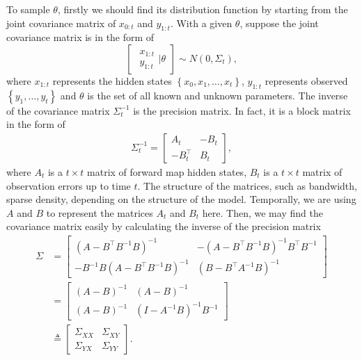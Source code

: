 To sample $\theta$, firstly we should find its distribution function by starting from the joint covariance matrix of $x_{0:t}$ and $y_{1:t}$. With a given $\theta$, suppose the joint covariance matrix is in the form of 
\begin{equation}\label{generaljointmatrix}
\begin{bmatrix} \begin{matrix} x_{1:t}\\ y_{1:t}  \end{matrix} \biggr\rvert \theta \end{bmatrix}
\sim N\left(0, \Sigma_t \right),
\end{equation}
where $x_{1:t}$ represents the hidden states $\left\lbrace x_0,x_1,\dots,x_t\right\rbrace$, $y_{1:t}$ represents observed $\left\lbrace y_1,\dots,y_t\right\rbrace$ and $\theta$ is the set of all known and unknown parameters. The inverse of the covariance matrix $\Sigma_t^{-1}$ is the precision matrix. In fact, it is a block matrix in the form of 
\begin{align*} \Sigma_t^{-1}=
\begin{bmatrix}
A_t& -B_t \\ -B_t^\top & B_t
\end{bmatrix}, 
\end{align*}
where $A_t$ is a $t \times t$ matrix of forward map hidden states, $B_t$ is a $t\times t$ matrix of observation errors up to time $t$. The structure of the matrices, such as bandwidth, sparse density, depending on the structure of the model. Temporally, we are using $A$ and $B$ to represent the matrices  $A_t$ and $B_t$ here. Then, we may find the covariance matrix easily by calculating the inverse of the precision matrix 
\begin{align*}
\Sigma &= \begin{bmatrix}
\left(A-B^\top B^{-1}B\right) ^{-1} & -\left(A-B^\top B^{-1}B\right)^{-1}B^\top B^{-1}\\
- B^{-1}B\left(A-B^\top B^{-1}B\right)^{-1} & \left(B-B^\top A^{-1}B\right) ^{-1}
\end{bmatrix} \\
&= \begin{bmatrix}
\left(A-B\right) ^{-1} & \left(A-B\right)^{-1}\\
\left(A-B\right)^{-1} & \left(I- A^{-1}B\right) ^{-1}B^{-1}
\end{bmatrix} \\
&\triangleq \begin{bmatrix}
\Sigma_{XX} & \Sigma_{XY} \\
\Sigma_{YX}  &\Sigma_{YY} 
\end{bmatrix}.
\end{align*}
